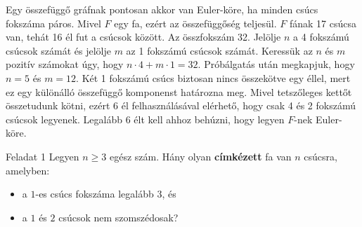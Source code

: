 \begin{solution}
Egy összefüggő gráfnak pontosan akkor van Euler-köre, ha minden csúcs
fokszáma páros. Mivel $F$ egy fa, ezért az összefüggőség teljesül.
$F$ fának 17 csúcsa van, tehát 16 él fut a csúcsok között. Az összfokszám
32. Jelölje $n$ a 4 fokszámú csúcsok számát és jelölje $m$ az 1
fokszámú csúcsok számát. Keressük az $n$ és $m$ pozitív számokat
úgy, hogy $n\cdot4+m\cdot1=32$. Próbálgatás után megkapjuk, hogy
$n=5$ és $m=12$. Két 1 fokszámú csúcs biztosan nincs összekötve
egy éllel, mert ez egy különálló összefüggő komponenst határozna meg.
Mivel tetszőleges kettőt összetudunk kötni, ezért 6 él felhasználásával
elérhető, hogy csak 4 és 2 fokszámú csúcsok legyenek. Legalább 6 élt
kell ahhoz behúzni, hogy legyen $F$-nek Euler-köre. 
\end{solution}
\begin{extraproblem}
Feladat 1 Legyen $n\geq3$ egész szám. Hány olyan \textbf{címkézett}
fa van $n$ csúcsra, amelyben: 
\begin{itemize}
\item a $1$-es csúcs fokszáma legalább $3$, és 
\item a $1$ és $2$ csúcsok nem szomszédosak? 
\end{itemize}
\end{extraproblem}

